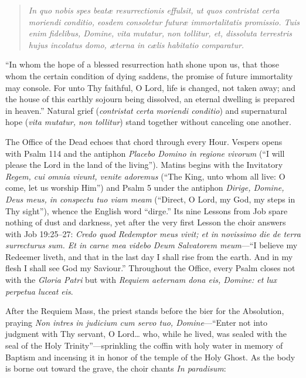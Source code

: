 \begin{quote}
\emph{In quo nobis spes beat\ae{} resurrectionis effulsit, ut quos contristat certa moriendi conditio, eosdem consoletur futur\ae{} immortalitatis promissio. Tuis enim fidelibus, Domine, vita mutatur, non tollitur, et, dissoluta terrestris hujus incolatus domo, \ae{}terna in c\ae{}lis habitatio comparatur.}
\end{quote}

``In whom the hope of a blessed resurrection hath shone upon us, that those whom the certain condition of dying saddens, the promise of future immortality may console. For unto Thy faithful, O Lord, life is changed, not taken away; and the house of this earthly sojourn being dissolved, an eternal dwelling is prepared in heaven.'' Natural grief (\emph{contristat certa moriendi conditio}) and supernatural hope (\emph{vita mutatur, non tollitur}) stand together without canceling one another.

The Office of the Dead echoes that chord through every Hour. Vespers opens with Psalm 114 and the antiphon \emph{Placebo Domino in regione vivorum} (``I will please the Lord in the land of the living''). Matins begins with the Invitatory \emph{Regem, cui omnia vivunt, venite adoremus} (``The King, unto whom all live: O come, let us worship Him'') and Psalm 5 under the antiphon \emph{Dirige, Domine, Deus meus, in conspectu tuo viam meam} (``Direct, O Lord, my God, my steps in Thy sight''), whence the English word ``dirge.'' Its nine Lessons from Job spare nothing of dust and darkness, yet after the very first Lesson the choir answers with Job 19:25--27: \emph{Credo quod Redemptor meus vivit; et in novissimo die de terra surrecturus sum. Et in carne mea videbo Deum Salvatorem meum}---``I believe my Redeemer liveth, and that in the last day I shall rise from the earth. And in my flesh I shall see God my Saviour.'' Throughout the Office, every Psalm closes not with the \emph{Gloria Patri} but with \emph{Requiem aeternam dona eis, Domine: et lux perpetua luceat eis}.

After the Requiem Mass, the priest stands before the bier for the Absolution, praying \emph{Non intres in judicium cum servo tuo, Domine}---``Enter not into judgment with Thy servant, O Lord\ldots{} who, while he lived, was sealed with the seal of the Holy Trinity''---sprinkling the coffin with holy water in memory of Baptism and incensing it in honor of the temple of the Holy Ghost. As the body is borne out toward the grave, the choir chants \emph{In paradisum}:

